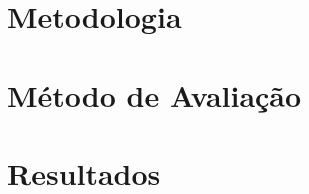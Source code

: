 \section{Metodologia}
\label{cha:metodologia}
	

\section{Método de Avaliação}
\label{cha:avaliacao}
	

\section{Resultados}
\label{cha:resultados}
	

